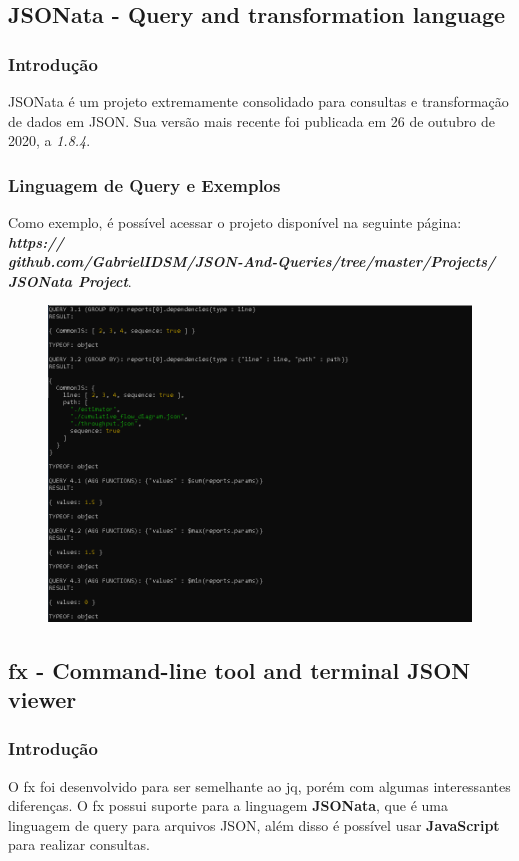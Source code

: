 \documentclass[a4paper, 12pt] {article}
\begin{document}
		\subsection{JSONata - Query and transformation language}
			\subsubsection{Introdução}
				JSONata é um projeto extremamente consolidado para consultas e transformação de dados em JSON. Sua versão mais recente foi publicada em 26 de outubro de 2020, a \textit{1.8.4}.
			\subsubsection{Linguagem de Query e Exemplos}
				Como exemplo, é possível acessar o projeto disponível na seguinte página: \textbf{\textit{https://\\github.com/GabrielIDSM/JSON-And-Queries/tree/master/Projects/\\JSONata Project}}.

				\begin{figure}[H]
					\centering
					\includegraphics[width=16cm]{JSONata.png}
					\label{figure:Image}
				\end{figure}
		\newpage \subsection{fx - Command-line tool and terminal JSON viewer}
			\subsubsection{Introdução}
				O fx foi desenvolvido para ser semelhante ao jq, porém com algumas interessantes diferenças. O fx possui suporte para a linguagem \textbf{JSONata}, que é uma linguagem de query para arquivos JSON, além disso é possível usar \textbf{JavaScript} para realizar consultas.
\end{document}
